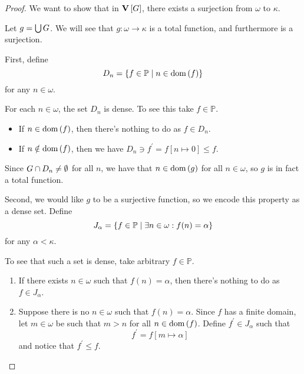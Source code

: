 \documentclass[11pt]{article}
\renewcommand{\P}{\mathbb{P}}
\begin{document}
\newcommand{\m}{\verum[G]}

\begin{proof}
    We want to show that in $\m$, there exists a surjection from $\omega$ to
    $\kappa$.

    Let $g = \bigcup G$.
    We will see that $g : \omega \to \kappa$ is a total function, and
    furthermore is a surjection.

    First, define
    \begin{equation*}
        D_n = \setof{ f \in \P \sth n \in \dom{f} }
    \end{equation*}
    for any $n \in \omega$.

    For each $n \in \omega$, the set $D_n$ is dense.
    To see this take $f \in \P$.
    \begin{itemize}
        \item
            If $n \in \operatorname{dom}{\left(f\right)}$, then there's nothing to do as $f \in D_n$.
        \item
            If $n \notin \operatorname{dom}{\left(f\right)}$,
            then we have $D_n \ni f^\prime = f[n \mapsto 0] \leq f$.
    \end{itemize}

    Since $G \cap D_n \neq \emptyset$ for all $n$, we have that
    $n \in \operatorname{dom}{\left(g\right)}$ for all $n \in \omega$, so $g$ is in fact a total function.

    Second, we would like $g$ to be a surjective function, so we encode this
    property as a dense set.
    Define
    \begin{equation*}
        J_{\alpha} = \setof{
            f \in \P \sth \exists n \in \omega : f(n) = \alpha
        }
    \end{equation*}
    for any $\alpha < \kappa$.

    To see that such a set is dense, take arbitrary $f \in \P$.
    \begin{enumerate}
        \item
            If there exists $n \in \omega$ such that $f(n) = \alpha$,
            then there's nothing to do as $f \in J_\alpha$.
        \item
            Suppose there is no $n \in \omega$ such that $f(n) = \alpha$.
            Since $f$ has a finite domain, let $m \in \omega$ be such that
            $m > n$ for all $n \in \operatorname{dom}{\left(f\right)}$.
            Define $f^\prime \in J_{\alpha}$ such that
            \begin{equation*}
                f^\prime = f[m \mapsto \alpha]
            \end{equation*}
            and notice that $f^\prime \leq f$.
    \end{enumerate}


\end{proof}
\end{document}
